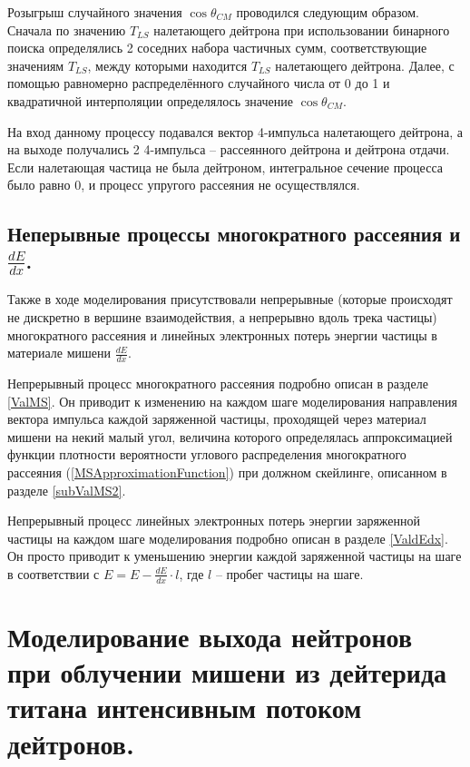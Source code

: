 \documentclass[a4paper,12pt]{article}
\begin{document}
\begin{large}
	Розыгрыш случайного значения $\cos{\theta_{CM}}$ проводился следующим образом.
	Сначала по значению $T_{LS}$ налетающего дейтрона при использовании бинарного поиска определялись 2 соседних набора частичных сумм, соответствующие значениям $T_{LS}$, между которыми находится $T_{LS}$ налетающего дейтрона.
	Далее, с помощью равномерно распределённого случайного числа от 0 до 1 и квадратичной интерполяции определялось значение $\cos{\theta_{CM}}$.
	
	На вход данному процессу подавался вектор 4-импульса налетающего дейтрона, а на выходе получались 2 4-импульса -- рассеянного дейтрона и дейтрона отдачи.
	Если налетающая частица не была дейтроном, интегральное сечение процесса было равно 0, и процесс упругого рассеяния не осуществлялся.
	
	
\subsection{Неперывные процессы многократного рассеяния и $\frac{dE}{dx}$.}
\label{MSanddEdxRealization}

	Также в ходе моделирования присутствовали непрерывные (которые происходят не дискретно в вершине взаимодействия, а непрерывно вдоль трека частицы) многократного рассеяния и линейных электронных потерь энергии частицы в материале мишени $\frac{dE}{dx}$.
	
	Непрерывный процесс многократного рассеяния подробно описан в разделе \ref{ValMS}.
	Он приводит к изменению на каждом шаге моделирования направления вектора импульса каждой заряженной частицы, проходящей через материал мишени на некий малый угол, величина которого определялась аппроксимацией функции плотности вероятности углового распределения многократного рассеяния (\ref{MSApproximationFunction}) при должном скейлинге, описанном в разделе \ref{subValMS2}.
	
	Непрерывный процесс линейных электронных потерь энергии заряженной частицы на каждом шаге моделирования подробно описан в разделе \ref{ValdEdx}.
	Он просто приводит к уменьшению энергии каждой заряженной частицы на шаге в соответствии с $E=E-\frac{dE}{dx} \cdot l$, где $l$ -- пробег частицы на шаге.

	
\clearpage{}
\section{Моделирование выхода нейтронов при облучении мишени из дейтерида титана интенсивным потоком дейтронов.}
\label{NeutronOutput}


\end{large}
\end{document}
